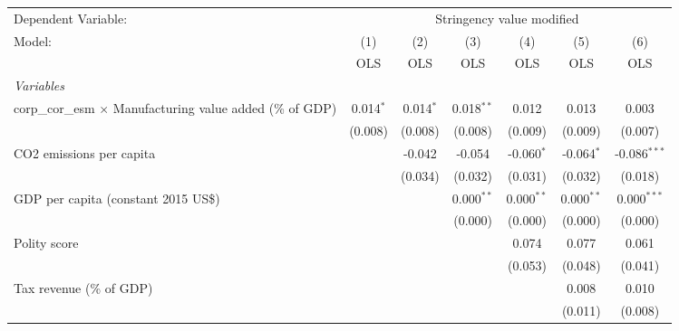 
\begingroup
\centering
\begin{tabular}{lcccccc}
   \toprule
   Dependent Variable: & \multicolumn{6}{c}{Stringency value modified}\\
   Model:                                                            & (1)         & (2)         & (3)          & (4)          & (5)          & (6)\\  
                                                                     &  OLS        & OLS         & OLS          & OLS          & OLS          & OLS\\  
   \midrule
   \emph{Variables}\\
   corp\_cor\_esm $\times$ Manufacturing value added (\% of GDP)     & 0.014$^{*}$ & 0.014$^{*}$ & 0.018$^{**}$ & 0.012        & 0.013        & 0.003\\   
                                                                     & (0.008)     & (0.008)     & (0.008)      & (0.009)      & (0.009)      & (0.007)\\   
   CO2 emissions per capita                                          &             & -0.042      & -0.054       & -0.060$^{*}$ & -0.064$^{*}$ & -0.086$^{***}$\\   
                                                                     &             & (0.034)     & (0.032)      & (0.031)      & (0.032)      & (0.018)\\   
   GDP per capita (constant 2015 US\$)                               &             &             & 0.000$^{**}$ & 0.000$^{**}$ & 0.000$^{**}$ & 0.000$^{***}$\\   
                                                                     &             &             & (0.000)      & (0.000)      & (0.000)      & (0.000)\\   
   Polity score                                                      &             &             &              & 0.074        & 0.077        & 0.061\\   
                                                                     &             &             &              & (0.053)      & (0.048)      & (0.041)\\   
   Tax revenue (\% of GDP)                                           &             &             &              &              & 0.008        & 0.010\\   
                                                                     &             &             &              &              & (0.011)      & (0.008)\\   

\end{tabular}
